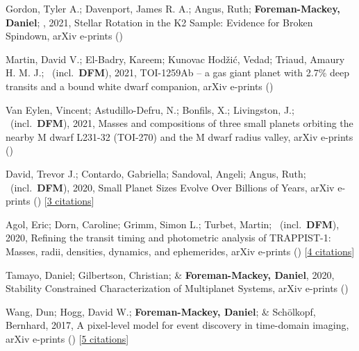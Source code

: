 \item[{\color{numcolor}\scriptsize10}] Gordon, Tyler A.; Davenport, James R. A.; Angus, Ruth; \textbf{Foreman-Mackey, Daniel}; \etal, 2021, Stellar Rotation in the K2 Sample: Evidence for Broken Spindown, arXiv e-prints ()

\item[{\color{numcolor}\scriptsize9}] Martin, David V.; El-Badry, Kareem; Kunovac Hod{\v{z}}i{\'c}, Vedad; Triaud, Amaury H. M. J.; \etal\ (incl.\ \textbf{DFM}), 2021, TOI-1259Ab -- a gas giant planet with 2.7{\%} deep transits and a bound white dwarf companion, arXiv e-prints ()

\item[{\color{numcolor}\scriptsize8}] Van Eylen, Vincent; Astudillo-Defru, N.; Bonfils, X.; Livingston, J.; \etal\ (incl.\ \textbf{DFM}), 2021, Masses and compositions of three small planets orbiting the nearby M dwarf L231-32 (TOI-270) and the M dwarf radius valley, arXiv e-prints ()

\item[{\color{numcolor}\scriptsize7}] David, Trevor J.; Contardo, Gabriella; Sandoval, Angeli; Angus, Ruth; \etal\ (incl.\ \textbf{DFM}), 2020, Small Planet Sizes Evolve Over Billions of Years, arXiv e-prints () [\href{https://ui.adsabs.harvard.edu/abs/2020arXiv201109894D}{3 citations}]

\item[{\color{numcolor}\scriptsize6}] Agol, Eric; Dorn, Caroline; Grimm, Simon L.; Turbet, Martin; \etal\ (incl.\ \textbf{DFM}), 2020, Refining the transit timing and photometric analysis of TRAPPIST-1: Masses, radii, densities, dynamics, and ephemerides, arXiv e-prints () [\href{https://ui.adsabs.harvard.edu/abs/2020arXiv201001074A}{4 citations}]

\item[{\color{numcolor}\scriptsize5}] Tamayo, Daniel; Gilbertson, Christian; \& \textbf{Foreman-Mackey, Daniel}, 2020, Stability Constrained Characterization of Multiplanet Systems, arXiv e-prints ()

\item[{\color{numcolor}\scriptsize4}] Wang, Dun; Hogg, David W.; \textbf{Foreman-Mackey, Daniel}; \& Sch{\"o}lkopf, Bernhard, 2017, A pixel-level model for event discovery in time-domain imaging, arXiv e-prints () [\href{https://ui.adsabs.harvard.edu/abs/2017arXiv171002428W}{5 citations}]

